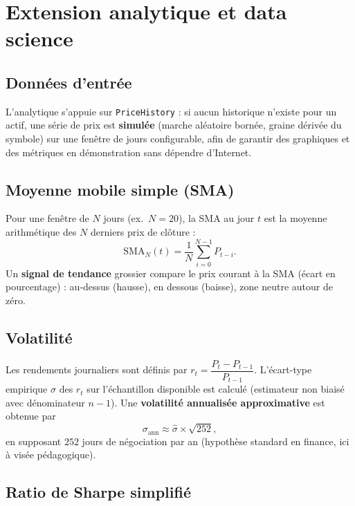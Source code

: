 \chapter{Extension analytique et data science}
\label{ch:ds}

\section{Données d'entrée}

L'analytique s'appuie sur \texttt{PriceHistory} : si aucun historique n'existe pour un actif, une série de prix est \textbf{simulée} (marche aléatoire bornée, graine dérivée du symbole) sur une fenêtre de jours configurable, afin de garantir des graphiques et des métriques en démonstration sans dépendre d'Internet.

\section{Moyenne mobile simple (SMA)}

Pour une fenêtre de $N$ jours (ex.\ $N=20$), la SMA au jour $t$ est la moyenne arithmétique des $N$ derniers prix de clôture :
\begin{equation}
  \mathrm{SMA}_N(t) = \frac{1}{N}\sum_{i=0}^{N-1} P_{t-i}.
\end{equation}
Un \textbf{signal de tendance} grossier compare le prix courant à la SMA (écart en pourcentage) : au-dessus (hausse), en dessous (baisse), zone neutre autour de zéro.

\section{Volatilité}

Les rendements journaliers sont définis par $r_t = \dfrac{P_t - P_{t-1}}{P_{t-1}}$. L'écart-type empirique $\hat{\sigma}$ des $r_t$ sur l'échantillon disponible est calculé (estimateur non biaisé avec dénominateur $n-1$). Une \textbf{volatilité annualisée approximative} est obtenue par
\begin{equation}
  \sigma_{\mathrm{ann}} \approx \hat{\sigma} \times \sqrt{252},
\end{equation}
en supposant $252$ jours de négociation par an (hypothèse standard en finance, ici à visée pédagogique).

\section{Ratio de Sharpe simplifié}

